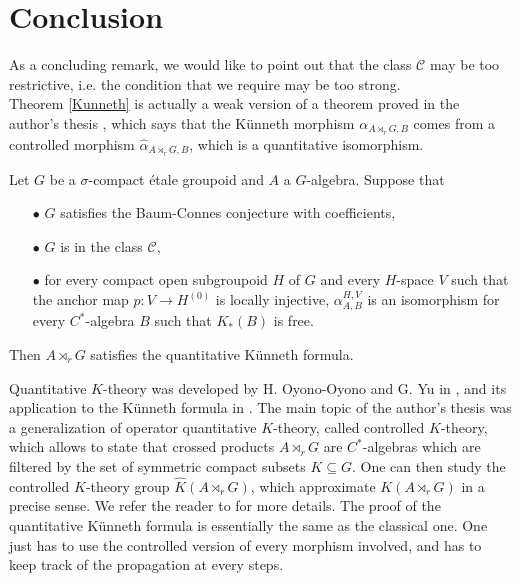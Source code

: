 \section{Conclusion}

As a concluding remark, we would like to point out that the class $\mathcal C$ may be too restrictive, i.e. the condition that we require may be too strong. \\

Theorem \ref{Kunneth} is actually a weak version of a theorem proved in the author's thesis \cite{DellAieraThesis}, which says that the Künneth morphism $\alpha_{A\rtimes_r G,B}$ comes from a controlled morphism $\hat \alpha_{A\rtimes_r G,B}$, which is a quantitative isomorphism.

\begin{thm}
Let $G$ be a $\sigma$-compact étale groupoid and $A$ a $G$-algebra. Suppose that 
\begin{itemize}
\item[$\bullet$] $G$ satisfies the Baum-Connes conjecture with coefficients,
\item[$\bullet$] $G$ is in the class $\mathcal C$,
\item[$\bullet$] for every compact open subgroupoid $H$ of $G$ and every $H$-space $V$ such that the anchor map $p : V \rightarrow H^{(0)}$ is locally injective, $\alpha_{A,B}^{H,V}$ is an isomorphism for every $C^*$-algebra $B$ such that $K_*(B)$ is free.
\end{itemize} 
Then $A\rtimes_r G$ satisfies the quantitative Künneth formula.
\end{thm}

Quantitative $K$-theory was developed by H. Oyono-Oyono and G. Yu in \cite{OY2}, and its application to the Künneth formula in \cite{OY4}. The main topic of the author's thesis \cite{DellAieraThesis} was a generalization of operator quantitative $K$-theory, called controlled $K$-theory, which allows to state that crossed products $A\rtimes_r G$ are $C^*$-algebras which are filtered by the set of symmetric compact subsets $K\subseteq G$. One can then study the controlled $K$-theory group $\hat K(A\rtimes_r G)$, which approximate $K(A\rtimes_r G)$ in a precise sense. We refer the reader to \cite{DellAieraThesis} for more details. The proof of the quantitative Künneth formula is essentially the same as the classical one. One just has to use the controlled version of every morphism involved, and has to keep track of the propagation at every steps. 


